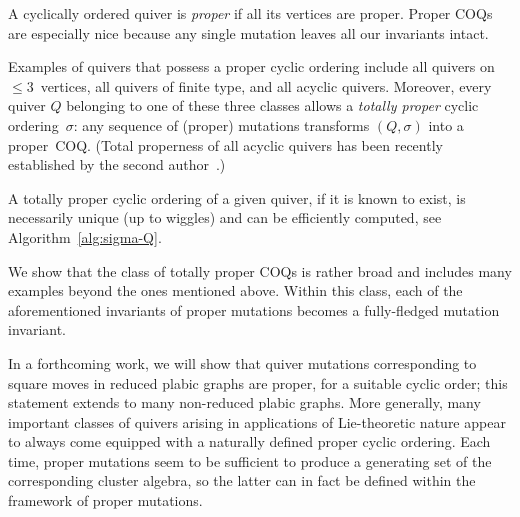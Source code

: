 \documentclass[11pt, letterpaper]{amsart}
\theoremstyle{definition}
\numberwithin{equation}{section}
\begin{document}
A cyclically ordered quiver is \emph{proper} if all its vertices are proper.
Proper COQs are especially nice because any single mutation leaves all our invariants intact.

Examples of quivers that possess a proper cyclic ordering %
%
include all quivers on $\le3$~vertices, all quivers of finite type, and all acyclic quivers. 
Moreover, every quiver $Q$ belonging to one of these three classes allows a 
\emph{totally proper} cyclic ordering~$\sigma$:
any sequence of (proper) mutations transforms $(Q,\sigma)$ into a proper~COQ. 
(Total properness of all acyclic quivers has been recently established by the second author~\cite{SN-acyclic-TP}.)

\pagebreak[3]

A totally proper cyclic ordering of a given quiver, if it is known to exist, is necessarily unique (up to wiggles) 
and can be efficiently computed, see Algorithm~\ref{alg:sigma-Q}. 

We show that the class of totally proper COQs is rather broad 
and includes many examples beyond the ones mentioned above. 
Within this class, %
each of the aforementioned invariants of proper mutations
becomes a fully-fledged mutation invariant. 

In a forthcoming work, we will show that quiver mutations corresponding to square moves 
in reduced plabic graphs are proper, for a suitable cyclic order; 
this statement extends to many non-reduced plabic graphs. 
More generally, many important classes of quivers arising in applications of Lie-theoretic nature
appear to always come equipped with a naturally defined proper cyclic ordering.
Each time, proper mutations seem to be sufficient to produce a generating set 
of the corresponding cluster algebra, so the latter can in fact be defined
within the framework of proper mutations. 
\end{document}
